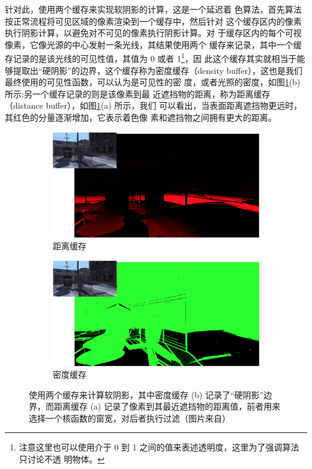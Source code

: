 针对此，\cite{a:Implementingfastraytracedsoftshadowsinagameengine}使用两个缓存来实现软阴影的计算，这是一个延迟着 色算法，首先算法按正常流程将可见区域的像素渲染到一个缓存中，然后针对 这个缓存区内的像素执行阴影计算，以避免对不可见的像素执行阴影计算。对 于缓存区内的每个可视像素，它像光源的中心发射一条光线，其结果使用两个 缓存来记录，其中一个缓存记录的是该光线的可见性值，其值为 0 或者 1\footnote{注意这里也可以使用介于 0 到 1 之间的值来表述透明度，这里为了强调算法只讨论不透 明物体。}，因 此这个缓存其实就相当于能够提取出“硬阴影”的边界，这个缓存称为密度缓存（density buffer），这也是我们最终使用的可见性函数，可以认为是可见性的密 度，或者光照的密度，如图\ref{f:df-ray-tracing-buffers}(b) 所示;另一个缓存记录的则是该像素到最 近遮挡物的距离，称为距离缓存（distance buffer），如图\ref{f:df-ray-tracing-buffers}(a) 所示，我们 可以看出，当表面距离遮挡物更远时，其红色的分量逐渐增加，它表示着色像 素和遮挡物之间拥有更大的距离。

\begin{figure}
\begin{fullwidth}
	\begin{subfigure}[b]{0.5\thewidth}
		\includegraphics[width=\textwidth]{figures/shadows/ray-tracing-distance-buffer}	
		\caption{距离缓存}
	\end{subfigure}
	\begin{subfigure}[b]{0.5\thewidth}
		\includegraphics[width=\textwidth]{figures/shadows/ray-tracing-density-buffer}	
		\caption{密度缓存}
	\end{subfigure}
\caption{使用两个缓存来计算软阴影，其中密度缓存 (b) 记录了“硬阴影”边界，而距离缓存 (a) 记录了像素到其最近遮挡物的距离值，前者用来选择一个核函数的窗宽，对后者执行过滤（图片来自\cite{a:Implementingfastraytracedsoftshadowsinagameengine}）}
\label{f:df-ray-tracing-buffers}
\end{fullwidth}
\end{figure}


